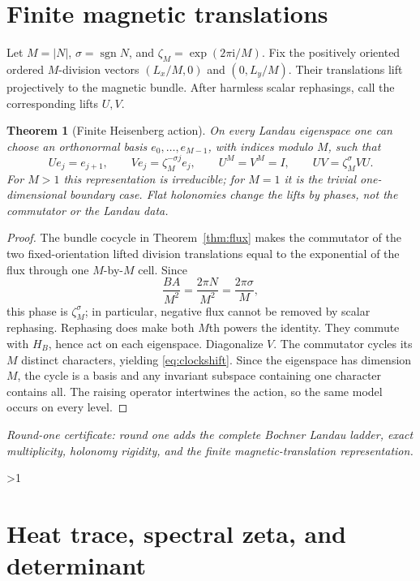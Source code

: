 \documentclass[10pt]{article}
\newcommand{\ii}{\mathrm i}
\newcommand{\sgn}{\operatorname{sgn}}
\newtheorem{theorem}{Theorem}
\begin{document}
\section{Finite magnetic translations}

Let $M=|N|$, $\sigma=\sgn N$, and $\zeta_M=\exp(2\pi\ii/M)$.  Fix the
positively oriented ordered $M$-division vectors
$(L_x/M,0)$ and $(0,L_y/M)$.  Their translations lift projectively to the
magnetic bundle.  After harmless scalar rephasings, call the corresponding
lifts $U,V$.

\begin{theorem}[Finite Heisenberg action]
On every Landau eigenspace one can choose an orthonormal basis
$e_0,\ldots,e_{M-1}$, with indices modulo $M$, such that
\begin{equation}
 Ue_j=e_{j+1},\qquad Ve_j=\zeta_M^{-\sigma j}e_j,
 \qquad U^M=V^M=I,\qquad UV=\zeta_M^\sigma VU.  \label{eq:clockshift}
\end{equation}
For $M>1$ this representation is irreducible; for $M=1$ it is the trivial
one-dimensional boundary case.  Flat holonomies change the lifts by
phases, not the commutator or the Landau data.
\end{theorem}

\begin{proof}
The bundle cocycle in Theorem~\ref{thm:flux} makes the commutator of the two
fixed-orientation lifted division translations equal to the exponential of
the flux through one $M$-by-$M$ cell.  Since
\[
 \frac{BA}{M^2}=\frac{2\pi N}{M^2}=\frac{2\pi\sigma}{M},
\]
this phase is $\zeta_M^\sigma$; in particular, negative flux cannot be
removed by scalar rephasing.  Rephasing does make both $M$th powers the identity.
They commute with $H_B$, hence act on each eigenspace.  Diagonalize $V$.
The commutator cycles its $M$ distinct characters, yielding
\eqref{eq:clockshift}.  Since the eigenspace has dimension $M$, the cycle is
a basis and any invariant subspace containing one character contains all.
The raising operator intertwines the action, so the same model occurs on
every level.
\end{proof}

\noindent\textit{Round-one certificate: round one adds the complete
Bochner Landau ladder, exact multiplicity, holonomy rigidity, and the
finite magnetic-translation representation.}
\fi

\ifnum\CRevisionRound>1
\section{Heat trace, spectral zeta, and determinant}
\end{document}
